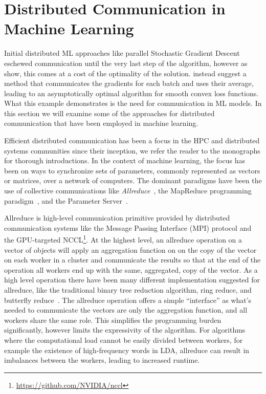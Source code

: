 \section{Distributed Communication in Machine Learning}
\label{sec:bg-ml-communication}

Initial distributed ML approaches like parallel Stochastic Gradient Descent
\cite{parallel-sgd} eschewed communication until the very last step of the
algorithm, however as \citet{dekel-optimal-distributed} show, this comes
at a cost of the optimality of the solution. \citet{dekel-optimal-distributed}
instead suggest a method that communicates the gradients for each batch and uses
their average, leading to an asymptotically optimal algorithm for smooth
convex loss functions. What this example demonstrates is the need for communication
in ML models. In this section we will examine some of the approaches for distributed
communication that have been employed in machine learning.

Efficient distributed communication has been a focus in the HPC and distributed systems
communities since their inception, we refer the reader to the monographs
\cite{hpc-intro, distributed-systems-book, distributed-systems-programming, distributed-systems-computation} for thorough introductions.
In the context of machine learning, the focus has been on ways to synchronize
sets of parameters, commonly represented as vectors or matrices, over a network
of computers. The dominant paradigms have been the use of collective communications
like \emph{Allreduce}~\cite{allreduce}, the MapReduce programming paradigm~\cite{mapreduce},
and the Parameter Server~\cite{muPS}.

Allreduce is high-level communication primitive provided by distributed communication
systems like the Message Passing Interface (MPI) protocol \cite{mpi} and the
GPU-targeted NCCL\footnote{\url{https://github.com/NVIDIA/nccl}}. At the highest
level, an allreduce operation on a vector of objects will apply an aggregation
function on on the copy of the vector on each worker in a cluster and communicate
the results so that at the end of the operation all workers end up with the same,
aggregated, copy of the vector. As a high level operation there have been
many different implementation suggested for allreduce, like the traditional
binary tree reduction algorithm, ring reduce, and butterfly reduce~\cite{allreduce}.
The allreduce operation offers a simple ``interface'' as what's needed to communicate
the vectors are only the aggregation function, and all workers share the same role.
This simplifies the programming burden significantly, however limits the expressivity
of the algorithm. For algorithms where the computational load cannot be easily divided between
workers, for example the existence of high-frequency words in LDA\cite{lightLDA}, allreduce can result
in imbalances between the workers, leading to increased runtime\cite{straggler-ml, stale-sync-ps}.


